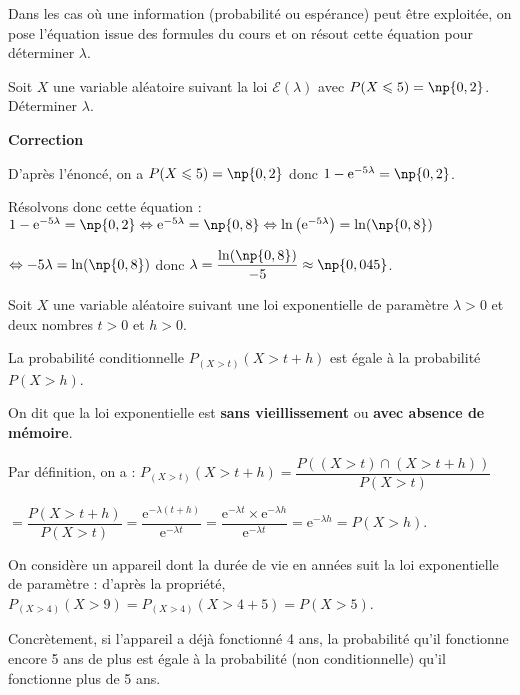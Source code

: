 \documentclass{cornouaille}
\begin{document}
\begin{methode}
Dans les cas où une information (probabilité ou espérance) peut être exploitée, on pose l'équation issue des formules du cours et on résout cette équation pour déterminer $\lambda$.

\exercice

Soit $X$ une variable aléatoire suivant la loi $\mathcal{E}(\lambda)$ avec $P(X\leqslant 5)=\np{0,2}$.
Déterminer $\lambda$.

\textbf{Correction}

D'après l'énoncé, on a $P(X\leqslant 5)=\np{0,2}$ donc $1-\textrm{e}^{-5 \lambda }=\np{0,2}$.

Résolvons donc cette équation : $1-\textrm{e}^{-5\lambda }=\np{0,2} \Leftrightarrow \textrm{e}^{-5\lambda }=\np{0,8} \Leftrightarrow \ln\left(\textrm{e}^{-5\lambda}\right)=\ln(\np{0,8})$

$\Leftrightarrow -5\lambda=\ln(\np{0,8})$ donc $\lambda = \dfrac{\ln(\np{0,8})}{-5}\approx \np{0,045}$.
\end{methode}



\begin{propriete}
Soit $X$ une variable aléatoire suivant une loi exponentielle de paramètre $\lambda>0$ et deux nombres $t>0$ et $h>0$.

La probabilité conditionnelle $P_{(X>t)}\left(X>t+h\right)$ est égale à la probabilité $P(X>h)$.

On dit que la loi exponentielle est \textbf{sans vieillissement} ou \textbf{avec absence de mémoire}.

\end{propriete}


\begin{preuve}
Par définition, on a : $P_{(X>t)}(X>t+h)=\dfrac{P((X>t)\cap (X>t+h))}{P(X>t)}$

$=\dfrac{P(X>t+h)}{P(X>t)}=\dfrac{\textrm{e}^{-\lambda(t+h)}}{\textrm{e}^{-\lambda t}}=\dfrac{\textrm{e}^{-\lambda t} \times \textrm{e}^{-\lambda h}}{\textrm{e}^{-\lambda t}}=\textrm{e}^{-\lambda h}=P(X>h)$.
\end{preuve}

\begin{exemple}
On considère un appareil dont la durée de vie en années suit la loi exponentielle de paramètre  : d'après la propriété, $P_{(X>4)}\left(X>9\right)=P_{(X>4)}\left(X>4+5\right)=P(X>5)$.

Concrètement, si l'appareil a déjà fonctionné 4 ans, la probabilité
qu'il fonctionne encore 5 ans de plus est égale à la probabilité (non
conditionnelle) qu'il fonctionne plus de 5 ans.
\end{exemple}
\end{document}
